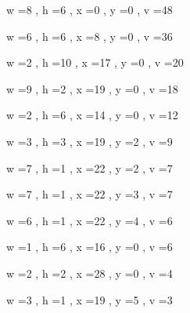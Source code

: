 \documentclass[11pt]{article}
\begin{document}
w =8 , h =6 , x =0 , y =0 , v =48
\par
w =6 , h =6 , x =8 , y =0 , v =36
\par
w =2 , h =10 , x =17 , y =0 , v =20
\par
w =9 , h =2 , x =19 , y =0 , v =18
\par
w =2 , h =6 , x =14 , y =0 , v =12
\par
w =3 , h =3 , x =19 , y =2 , v =9
\par
w =7 , h =1 , x =22 , y =2 , v =7
\par
w =7 , h =1 , x =22 , y =3 , v =7
\par
w =6 , h =1 , x =22 , y =4 , v =6
\par
w =1 , h =6 , x =16 , y =0 , v =6
\par
w =2 , h =2 , x =28 , y =0 , v =4
\par
w =3 , h =1 , x =19 , y =5 , v =3
\par
\newpage
\end{document}
